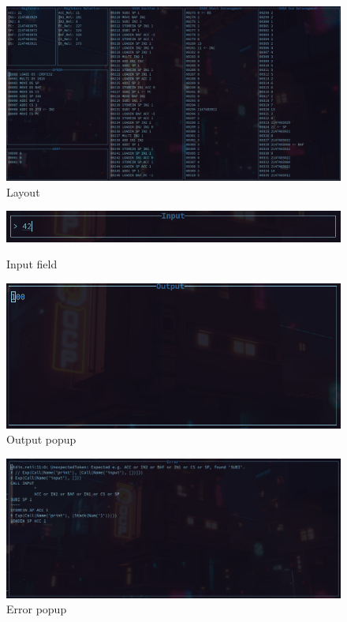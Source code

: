 \documentclass{report}
\begin{document}
\begin{figure}[H]
	\centering
	\includegraphics[width=\textwidth]{./figures/layout.png}
	\caption{Layout}
  \label{fig:layout}
\end{figure}
\begin{figure}[H]
	\begin{minipage}[b]{0.5\textwidth}
		\centering
		\includegraphics[width=\textwidth]{./figures/input_field.png}
		\caption{Input field}
    \label{fig:input field}
	\end{minipage}
	\begin{minipage}[b]{0.5\textwidth}
		\centering
		\includegraphics[width=\textwidth]{./figures/output_popup.png}
		\caption{Output popup}
    \label{fig:output popup}
	\end{minipage}
\end{figure}
\begin{figure}[H]
	\centering
	\includegraphics[width=\textwidth]{./figures/error_popup.png}
	\caption{Error popup}
  \label{fig:error popup}
\end{figure}
\end{document}
